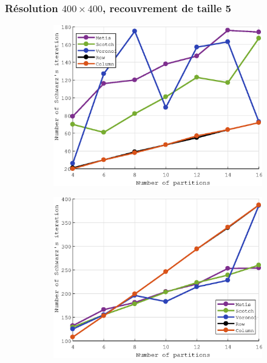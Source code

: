 \documentclass[a4paper,11pt]{article}
\begin{document}
\subsubsection{Résolution $400\times 400$, recouvrement de taille 5}
\vspace*{-3mm}
\begin{figure}[H]
	\centering
	\begin{subfigure}[t]{0.45\textwidth}
		\centering
		\includegraphics[width=\textwidth]{robin_400x400_5_iter.eps}
	\end{subfigure}
	\hfill
	\begin{subfigure}[t]{0.45\textwidth}
		\centering
		\includegraphics[width=\textwidth]{dirichlet_400x400_5_iter.eps}
	\end{subfigure}
\end{figure}
\end{document}
